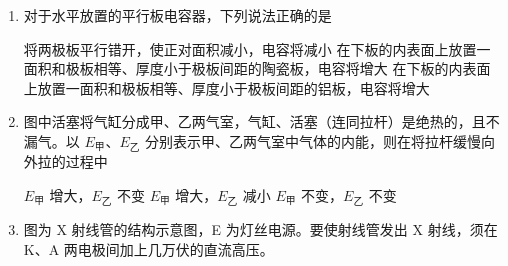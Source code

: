 \documentclass[\gkver]{gaokaozhenti}
\begin{document}
\begin{enumerate}
{$\arctan\frac{v^{2}}{Rg}$}
{$\frac{1}{2}\arcsin\frac{2v^{2}}{Rg}$}
{$\mathrm{arccot}\frac{v^{2}}{Rg}$}


\item
对于水平放置的平行板电容器，下列说法正确的是 

{将两极板平行错开，使正对面积减小，电容将减小}
{在下板的内表面上放置一面积和极板相等、厚度小于极板间距的陶瓷板，电容将增大}
{在下板的内表面上放置一面积和极板相等、厚度小于极板间距的铝板，电容将增大}


\item
图中活塞将气缸分成甲、乙两气室，气缸、活塞（连同拉杆）是绝热的，且不漏气。以 $E_{\text{甲}}$、$E_{\text{乙}}$ 分别表示甲、乙两气室中气体的内能，则在将拉杆缓慢向外拉的过程中 

{$E_{\text{甲}}$ 增大，$E_{\text{乙}}$ 不变}
{$E_{\text{甲}}$ 增大，$E_{\text{乙}}$ 减小}
{$E_{\text{甲}}$ 不变，$E_{\text{乙}}$ 不变}


\item
图为 X 射线管的结构示意图，E 为灯丝电源。要使射线管发出 X 射线，须在 K、A 两电极间加上几万伏的直流高压。 


\end{enumerate}
\end{document}
